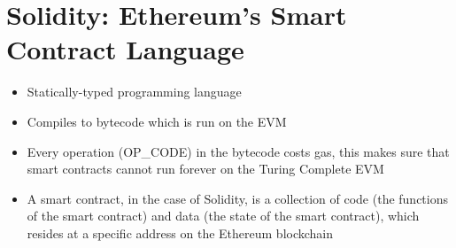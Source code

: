 \section{Solidity: Ethereum's Smart Contract Language}
\begin{itemize}
	\item Statically-typed programming language
	\item Compiles to bytecode which is run on the EVM
	\item Every operation (OP\_CODE) in the bytecode costs gas, this makes sure that smart contracts cannot run forever on the Turing Complete EVM
	\item A smart contract, in the case of Solidity, is a collection of code (the functions of the smart contract) and data (the state of the smart contract), which resides at a specific address on the Ethereum blockchain
\end{itemize}